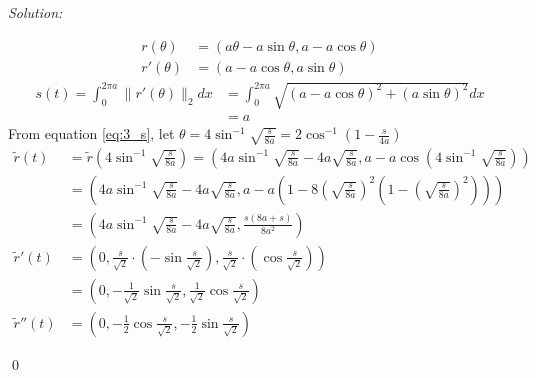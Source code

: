 \documentclass[12pt]{article}
\newenvironment{problem}[2][Problem]{\begin{trivlist}
\item[\hskip \labelsep {\bfseries #1}\hskip \labelsep {\bfseries #2.}]}{\end{trivlist}}
\newenvironment{sol}
{\emph{Solution:}
}
{
    \qed
    }
\begin{document}
\begin{sol}
    \begin{align}
        r(\theta)   &= (a \theta -a \sin{\theta}, a-a \cos{\theta}) \nonumber \\
        r'(\theta)  &= (a-a \cos{\theta},         a \sin{\theta})   \nonumber
    \end{align}
    \begin{align}
        s(t) = \int_0^{2\pi a} \lVert r'(\theta) \rVert _2 dx &= \int_0^{2\pi a} \sqrt{(a-a\cos{\theta})^2+(a\sin{\theta}) ^2}dx \nonumber\\ 
                                                                      &= a \label{eq:3_s}
    \end{align}
    From equation \ref{eq:3_s}, let $\theta = 4\sin^{-1}\sqrt{\frac{s}{8a}} = 2 \cos^{-1}(1-\frac{s}{4a})$
    \begin{align}
        \tilde{r}(t)   &= \tilde{r} \left( 4\sin^{-1}\sqrt{\frac{s}{8a}} \right) = \left(4a\sin^{-1}\sqrt{\frac{s}{8a}}-4a\sqrt{\frac{s}{8a}}, a-a\cos \left( 4\sin^{-1}\sqrt{\frac{s}{8a}}\right) \right) \nonumber\\
                       &= \left(4a\sin^{-1}\sqrt{\frac{s}{8a}}-4a\sqrt{\frac{s}{8a}}, a-a\left(1-8\left(\sqrt{\frac{s}{8a}}\right)^2 \left(1-\left(\sqrt{\frac{s}{8a}}\right)^2\right)\right) \right) \nonumber\\
                       &= \left(4a\sin^{-1}\sqrt{\frac{s}{8a}}-4a\sqrt{\frac{s}{8a}}, \frac{s(8a+s)}{8a^2} \right) \nonumber\\
        \tilde{r}'(t)  &= \left( 0, \frac{s}{\sqrt{2}} \cdot \left(-\sin\frac{s}{\sqrt{2}}\right), \frac{s}{\sqrt{2}} \cdot \left(\cos\frac{s}{\sqrt{2}}\right) \right) \nonumber\\
                       &= \left( 0, -\frac{1}{\sqrt{2}}\sin\frac{s}{\sqrt{2}}, \frac{1}{\sqrt{2}}\cos\frac{s}{\sqrt{2}} \right) \nonumber\\
        \tilde{r}''(t) &= \left( 0, -\frac{1}{2} \cos\frac{s}{\sqrt{2}}, -\frac{1}{2} \sin\frac{s}{\sqrt{2}} \right) \label{eq:2_r''}
    \end{align}
\end{sol}




\end{document}
